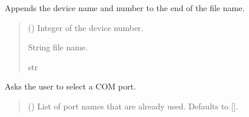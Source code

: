 \documentclass[letterpaper,10pt,english]{sphinxmanual}
\begin{document}
\begin{fulllineitems}
\begin{fulllineitems}
\end{fulllineitems}


\begin{fulllineitems}
\label{\detokenize{Setup_PodInterface:Setup_PodInterface.Setup_Interface._BuildFileName}}
\pysigstartsignatures
{}
\pysigstopsignatures
\sphinxAtStartPar
Appends the device name and number to the end of the file name.
\begin{quote}\begin{description}
\sphinxAtStartPar
{} () \textendash{} Integer of the device number.

\sphinxAtStartPar
String file name.

\sphinxAtStartPar
str

\end{description}\end{quote}

\end{fulllineitems}


\begin{fulllineitems}
\label{\detokenize{Setup_PodInterface:Setup_PodInterface.Setup_Interface._ChoosePort}}
\pysigstartsignatures
{}
\pysigstopsignatures
\sphinxAtStartPar
Asks the user to select a COM port.
\begin{quote}\begin{description}
\sphinxAtStartPar
{} (\sphinxstyleliteralemphasis{\sphinxupquote{{[}}}\sphinxstyleliteralemphasis{\sphinxupquote{{]}}}\sphinxstyleliteralemphasis{\sphinxupquote{, }}) \textendash{} List of port names that are already used. Defaults to {[}{]}.


\end{description}
\end{quote}
\end{fulllineitems}
\end{fulllineitems}
\end{document}
